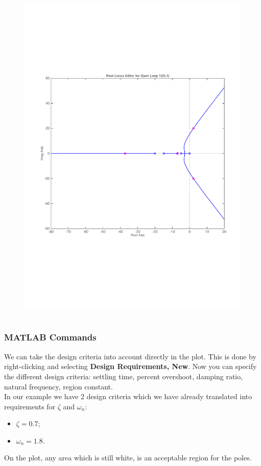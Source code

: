 \begin{frame}
\begin{exampleblock}{}
\begin{columns}
\begin{column}{0.5\textwidth}
\begin{figure}
{				\includegraphics[width=0.9\linewidth]{matlab_ex5}}
			\end{figure}
		\end{column}
	\end{columns}
	\end{exampleblock}
\end{frame}

\begin{frame}
\frametitle{MATLAB Commands}
	\begin{exampleblock}{}
		\justify
		We can take the design criteria into account directly in the plot. This is done by right-clicking and selecting \textbf{Design Requirements, New}. Now you can specify the different design criteria: settling time, percent overshoot, damping ratio, natural frequency, region constant.\\
		\vspace{1em}
		In our example we have 2 design criteria which we have already translated into requirements for $\zeta$ and $\omega_n$: 
		\begin{itemize}
			\item $\zeta = 0.7$;
			\item $\omega_n = 1.8$.
		\end{itemize}
		\vspace{1em}
		On the plot, any area which is still white, is an acceptable region for the poles.
	\end{exampleblock}
\end{frame}

